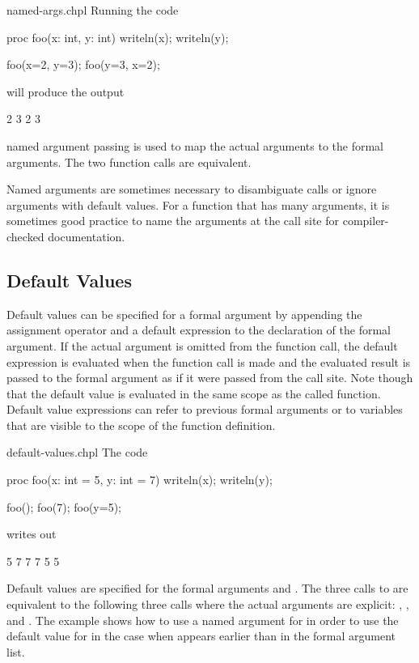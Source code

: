 \begin{chapelexample}{named-args.chpl}
Running the code
\begin{chapel}
proc foo(x: int, y: int) { writeln(x); writeln(y); }

foo(x=2, y=3);
foo(y=3, x=2);
\end{chapel}
will produce the output
\begin{chapelprintoutput}{}
2
3
2
3
\end{chapelprintoutput}
named argument passing is used to map the actual arguments to the
formal arguments.  The two function calls are equivalent.
\end{chapelexample}

Named arguments are sometimes necessary to disambiguate calls or
ignore arguments with default values.  For a function that has many
arguments, it is sometimes good practice to name the arguments at the
call site for compiler-checked documentation.

\subsection{Default Values}
\label{Default_Values}

Default values can be specified for a formal argument by appending the
assignment operator and a default expression to the declaration of the
formal argument.  If the actual argument is omitted from the function
call, the default expression is evaluated when the function call is
made and the evaluated result is passed to the formal argument as if
it were passed from the call site. Note though that the default value
is evaluated in the same scope as the called function. Default value
expressions can refer to previous formal arguments or to variables
that are visible to the scope of the function definition.

\begin{chapelexample}{default-values.chpl}
The code
\begin{chapel}
proc foo(x: int = 5, y: int = 7) { writeln(x); writeln(y); }

foo();
foo(7);
foo(y=5);
\end{chapel}
writes out
\begin{chapelprintoutput}{}
5
7
7
7
5
5
\end{chapelprintoutput}
Default values are specified for the formal arguments 
and .  The three calls to  are equivalent to the
following three calls where the actual arguments are
explicit: , , and .
The example  shows how to use a named argument
for  in order to use the default value for  in the
case when  appears earlier than  in the formal
argument list.
\end{chapelexample}


